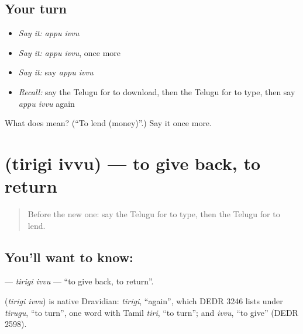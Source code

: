 \subsection*{Your turn}
\begin{itemize}
\raggedright
  \item \emph{Say it:} \emph{appu ivvu}
  \item \emph{Say it:} \emph{appu ivvu}, once more
  \item \emph{Say it:} say \emph{appu ivvu}
  \item \emph{Recall:} say the Telugu for to download, then the Telugu for to type, then say \emph{appu ivvu} again
\end{itemize}

\begin{tcolorbox}[breakable,colback=teal!4,colframe=teal!35!black,title={Before you move on}]
What does   mean? (\textquotedblleft{}To lend (money)\textquotedblright{}.) Say it once more.
\end{tcolorbox}
\section[\texorpdfstring{\te{తిరిగి} \te{ఇవ్వు} (tirigi ivvu)}{తిరిగి ఇవ్వు (tirigi ivvu)}]{  (tirigi ivvu) — to give back, to return}

\label{lesson:TE-C246-tirigi-ivvu}



\begin{quote}
Before the new one: say the Telugu for to type, then the Telugu for to lend.
\end{quote}

\subsection*{You'll want to know:  }
\textbf{ } — \emph{tirigi ivvu} — \textquotedblleft{}to give back, to return\textquotedblright{}.

\begin{cousinweb}
\textbf{ } (\emph{tirigi ivvu}) is native Dravidian: \emph{tirigi}, \textquotedblleft{}again\textquotedblright{}, which DEDR 3246 lists under \emph{tirugu}, \textquotedblleft{}to turn\textquotedblright{}, one word with Tamil \emph{tiri}, \textquotedblleft{}to turn\textquotedblright{}; and \emph{ivvu}, \textquotedblleft{}to give\textquotedblright{} (DEDR 2598).
\end{cousinweb}

